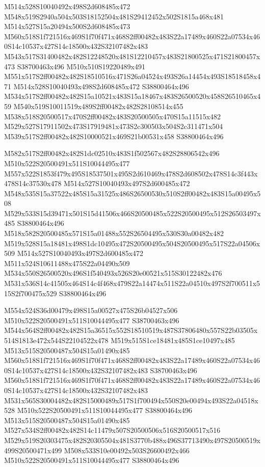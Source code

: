 \documentclass{article}
\begin{document}
\begin{multicols}{2}
M514x528S10040492x498S2d608485x472 M548x519S2940a504x503S18152504x481S29412452x502S1815a468x481 M514x527S15a20494x500S2d608485x473 M560x518S1f721516x469S1f70f471x468S2ff00482x483S22a17489x460S22a07534x460S14c10537x427S14c18500x432S32107482x483 M543x517S31400482x482S12248520x481S12210457x483S21800525x471S21800457x473 S38700463x496 M510x510S19220489x491 M551x517S2ff00482x482S18510516x471S26a04524x493S26a14454x493S18518458x471 M514x528S10040493x498S2d608485x472 S38800464x496 M534x517S2ff00482x482S15a10521x483S15a18467x483S26500520x458S26510465x459 M540x519S10011519x489S2ff00482x482S28108514x455 M538x518S20500517x470S2ff00482x483S20500505x470S15a11515x482 M529x527S17911502x473S17919481x473S2c300503x504S2c311471x504 M539x517S2ff00482x482S10000521x469S21b00531x458 S38800464x496

M582x517S2ff00482x482S1dc02510x483S1f502567x482S28806542x496 M510x522S20500491x511S10044495x477 M557x522S1853f479x495S18537501x495S2d610469x478S2d608502x478S14c3f443x478S14c37530x478 M514x527S10040493x497S2d600485x472 M548x535S15a37522x485S15a31525x486S26500530x510S2ff00482x483S15a00495x508 M529x533S15d39471x501S15d41506x466S20500485x522S20500495x512S26503497x485 S38800464x496 M518x582S20500485x571S15a01488x552S26504495x530S30a00482x482 M519x528S15a18481x498S1dc10495x472S20500495x504S20500495x517S22a04506x509 M514x527S10040493x497S2d600485x472 M511x524S10611488x475S22a04490x509 M534x550S26500520x496S1f540493x526S20e00521x515S30122482x476 M531x536S14c41505x464S14c4f468x479S22a14474x511S22a04510x497S2f700511x515S2f700475x529 S38800464x496

M554x524S36d00479x498S15a00527x475S26b04527x506 M510x522S20500491x511S10044495x477 S38700463x496 M544x564S2ff00482x482S15a36515x552S18510519x487S37806480x557S22b03505x514S1813e472x544S22104522x478 M519x515S1ce18481x485S1ce10497x485 M513x515S20500487x504S15a01490x485 M560x518S1f721516x469S1f70f471x468S2ff00482x483S22a17489x460S22a07534x460S14c10537x427S14c18500x432S32107482x483 S38700463x496 M560x518S1f721516x469S1f70f471x468S2ff00482x483S22a17489x460S22a07534x460S14c10537x427S14c18500x432S32107482x483 M531x565S30004482x482S15000489x517S1f700494x550S20e00494x493S22a04518x528 M510x522S20500491x511S10044495x477 S38800464x496 M513x515S20500487x504S15a01490x485 M527x534S2ff00482x482S14c11479x507S20500506x516S20500517x516 M529x519S20303475x482S20305504x481S3770b488x496S37713490x497S20500519x499S20500471x499 M508x533S10e00492x503S26600492x466 M510x522S20500491x511S10044495x477 S38800464x496


\end{multicols}
\end{document}

